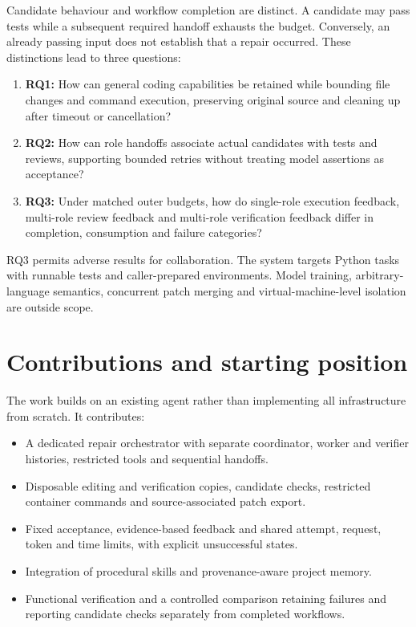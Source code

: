 Candidate behaviour and workflow completion are distinct. A candidate may pass tests while a subsequent required handoff exhausts the budget. Conversely, an already passing input does not establish that a repair occurred. These distinctions lead to three questions:

\begin{enumerate}
\def\labelenumi{\arabic{enumi}.}
\tightlist
\item
  \textbf{RQ1:} How can general coding capabilities be retained while bounding file changes and command execution, preserving original source and cleaning up after timeout or cancellation?
\item
  \textbf{RQ2:} How can role handoffs associate actual candidates with tests and reviews, supporting bounded retries without treating model assertions as acceptance?
\item
  \textbf{RQ3:} Under matched outer budgets, how do single-role execution feedback, multi-role review feedback and multi-role verification feedback differ in completion, consumption and failure categories?
\end{enumerate}

RQ3 permits adverse results for collaboration. The system targets Python tasks with runnable tests and caller-prepared environments. Model training, arbitrary-language semantics, concurrent patch merging and virtual-machine-level isolation are outside scope.

\section{Contributions and starting position}\label{sec:1.3}

The work builds on an existing agent rather than implementing all infrastructure from scratch. It contributes:

\begin{itemize}
\tightlist
\item
  A dedicated repair orchestrator with separate coordinator, worker and verifier histories, restricted tools and sequential handoffs.
\item
  Disposable editing and verification copies, candidate checks, restricted container commands and source-associated patch export.
\item
  Fixed acceptance, evidence-based feedback and shared attempt, request, token and time limits, with explicit unsuccessful states.
\item
  Integration of procedural skills and provenance-aware project memory.
\item
  Functional verification and a controlled comparison retaining failures and reporting candidate checks separately from completed workflows.
\end{itemize}

